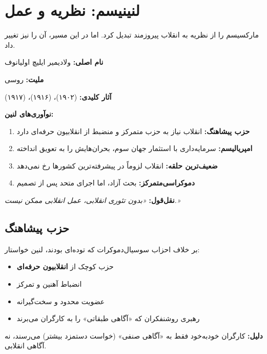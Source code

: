 \section{لنینیسم: نظریه و عمل}

 مارکسیسم را از نظریه به انقلاب پیروزمند تبدیل کرد. اما در این مسیر، آن را نیز تغییر داد.

\begin{personbox}

\textbf{نام اصلی:} ولادیمیر ایلیچ اولیانوف

\textbf{ملیت:} روسی

\textbf{آثار کلیدی:}  (۱۹۰۲)،  (۱۹۱۶)،  (۱۹۱۷)

\mediumspace

\textbf{نوآوری‌های لنین:}
\begin{enumerate}[nosep]
    \item \textbf{حزب پیشاهنگ:} انقلاب نیاز به حزب متمرکز و منضبط از انقلابیون حرفه‌ای دارد
    \item \textbf{امپریالیسم:} سرمایه‌داری با استثمار جهان سوم، بحران‌هایش را به تعویق انداخته
    \item \textbf{ضعیف‌ترین حلقه:} انقلاب لزوماً در پیشرفته‌ترین کشورها رخ نمی‌دهد
    \item \textbf{دموکراسی‌متمرکز:} بحث آزاد، اما اجرای متحد پس از تصمیم
\end{enumerate}

\mediumspace

\textbf{نقل‌قول:} \textit{«بدون تئوری انقلابی، عمل انقلابی ممکن نیست.»}
\end{personbox}

\subsection{حزب پیشاهنگ}

\begin{defbox}
بر خلاف احزاب سوسیال‌دموکرات که توده‌ای بودند، لنین خواستار:
\begin{itemize}[nosep]
    \item حزب کوچک از \textbf{انقلابیون حرفه‌ای}
    \item انضباط آهنین و تمرکز
    \item عضویت محدود و سخت‌گیرانه
    \item رهبری روشنفکران که «آگاهی طبقاتی» را به کارگران می‌برند
\end{itemize}
\textbf{دلیل:} کارگران خودبه‌خود فقط به «آگاهی صنفی» (خواست دستمزد بیشتر) می‌رسند، نه آگاهی انقلابی.
\end{defbox}

